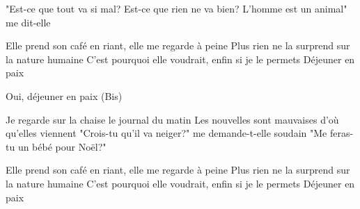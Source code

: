 "Est-ce que tout va si mal? Est-ce que rien ne va bien?
L'homme est un animal" me dit-elle
\endverse

\beginverse
Elle prend son café en riant, elle me regarde à peine
Plus rien ne la surprend sur la nature humaine
C'est pourquoi elle voudrait, enfin si je le permets
Déjeuner en paix
\endverse

\beginverse
Oui, déjeuner en paix
(Bis)
\endverse

\beginverse
Je regarde sur la chaise le journal du matin
Les nouvelles sont mauvaises d'où qu'elles viennent
"Crois-tu qu'il va neiger?" me demande-t-elle soudain
"Me feras-tu un bébé pour Noël?"
\endverse

\beginverse
Elle prend son café en riant, elle me regarde à peine
Plus rien ne la surprend sur la nature humaine
C'est pourquoi elle voudrait, enfin si je le permets
Déjeuner en paix
\]\]\]\]\]\]\]\]\]\]\]\]\]\]\]\]\]\]\]\]\]\]\]\]\]\]\]\]\]\]\]\]\]\]\]\]\]\]\]\]\]\]\]\]\]\]\]\]\]\]\]\]\]\]\]\]\]\]\]\]\]\]\]\]\]\]\]\]\]\]\]\]\]\]\]\]\]\]\]\]\]\]\]\]\]\]\]\]\]\]\]\]\]\]\]\]\]\]\]\]\]\]\]\]\]\]\]\]\]\]\]\]\]\]\]\]\]\]\]\]\]\]\]\]\]\]\]\]\]\]\]\]\]\]\]\]\]\]\]\]\]\]\]\]\]\]\]\]\]\]\]\]\]\]\]\]\]\]\]\]\]\]\]\]\]\]\]\]\]\]\]\]\]\]\]\]\]\]\]\]\]\]\]\]\]\]\]\]\]\]\]\]\]\]\]\]\]\]\]\]\]\]\]\]\]\]\]\]\]\]\]\]\]\]\]\]\]\]\]\]\]\]\]\]\]\]\]\]\]\]\]\]\]\]\]\]\]\]\]\]\]\]\]\]\]\]\]\]\]\]\]\]\]\]\]\]\]\]\]\]\]\]\]\]\]\]\]\]\]\]\]\]\]\]\]\]\]\]\]\]\]\]\]\]\]\]\]\]\]\]\]\]\]\]\]\]\]\]\]\]\]\]\]\]\]\]\]\]\]\]\]\]\]\]\]\]\]\]\]\]\]\]\]\]\]\]\]\]\]\]\]\]\]\]\]\]\]\]\]\]\]\]\]\]\]\]\]\]\]\]\]\]\]\]\]\]\]\]\]\]\]\]\]\]\]\]\]\]\]\]\]\]\]\]\]\]\]\]\]\]\]\]\]\]\]\]\]\]\]\]\]\]\]\]\]\]\]\]\]\]\]\]\]\]\]\]\]\]\]\]\]\]\]\]\]\]\]\]\]\]\]\]\]\]\]\]\]\]\]\]\]\]\]\]\]\]\]\]\]\]\]\]\]\]\]\]\]\]\]\]\]\]\]\]\]\]\]\]\]\]\]\]\]\]\]\]\]\]\]\]\]\]\]\]\]\]\]\]\]\]\]\]\]\]\]\]\]\]\]\]\]\]\]\]\]\]\]\]\]\]\]\]\]\]\]\]\]\]\]\]\]\]\]\]\]\]\]\]\]\]\]\]\]\]\]\]\]\]\]\]\]\]\]\]\]\]\]\]\]\]\]\]\]\]\]\]\]\]\]\]\]\]\]\]\]\]\]\]\]\]\]\]\]\]\]\]\]\]\]\]\]\]\]\]\]\]\]\]\]\]\]\]\]\]\]\]\]\]\]\]\]\]\]\]\]\]\]\]\]\]\]\]\]\]\]\]\]\]\]\]\]\]\]\]\]\]\]\]\]\]\]\]\]\]\]\]\]\]\]\]\]\]\]\]\]\]\]\]\]\]\]\]\]\]\]\]\]\]\]\]\]\]\]\]\]\]\]\]\]\]\]\]\]\]\]\]\]\]\]\]\]\]\]\]\]\]\]\]\]\]\]\]\]\]\]\]\]\]\]\]\]\]\]\]\]\]\]\]\]\]\]\]\]\]\]\]\]\]\]\]\]\]\]\]\]\]\]\]\]\]\]\]\]\]\]\]\]\]\]\]\]\]\]\]\]\]\]\]\]\]\]\]\]\]\]\]\]\]\]\]\]\]\]\]\]\]\]\]\]\]\]\]\]\]\]\]\]\]\]\]\]\]\]\]\]\]\]\]\]\]\]\]\]\]\]\]\]\]\]\]\]\]\]\]\]\]\]\]\]\]\]\]\]\]\]\]\]\]\]\]\]\]\]\]\]\]\]\]\]\]\]\]\]\]\]\]\]\]\]\]\]\]\]\]\]\]\]\]\]\]\]\]\]\]\]\]\]\]\]\]\]\]\]\]\]\]\]\]\]\]\]\]\]\]\]\]\]\]\]\]\]\]\]\]\]\]\]\]\]\]\]\]\]\]\]\]\]\]\]\]\]\]\]\]\]\]\]\]\]\]\]\]\]\]\]\]\]\]\]\]\]\]\]\]\]\]\]\]\]\]\]\]\]\]\]\]\]\]\]\]\]\]\]\]\]\]\]\]\]\]\]\]\]\]\]\]\]\]\]\]\]\]\]\]\]\]\]\]\]\]\]\]\]\]\]\]\]\]\]\]\]\]\]\]\]\]\]\]\]\]\]\]\]\]\]\]\]\]\]\]\]\]\]\]\]\]\]\]\]\]\]\]\]\]\]\]\]\]\]\]\]\]\]\]\]\]\]\]\]\]\]\]\]\]\]\]\]\]\]\]\]\]\]\]\]\]\]\]\]\]\]\]\]\]\]\]\]\]\]\]\]\]\]\]\]\]\]\]\]\]\]\]\]\]\]\]\]\]\]\]\]\]\]\]\]\]\]\]\]\]\]\]\]\]\]\]\]\]\]\]\]\]\]\]\]\]\]\]\]\]\]\]\]\]\]\]\]\]\]\]\]\]\]\]\]\]\]\]\]\]\]\]\]\]\]\]\]\]\]\]\]\]\]\]\]\]\]\]\]\]\]\]\]\]\]\]\]\]\]\]\]\]\]\]\]\]\]\]\]\]\]\]\]\]\]\]\]\]\]\]\]\]\]\]\]\]\]\]\]\]\]\]\]\]\]\]\]\]\]\]\]\]\]\]\]\]\]\]\]\]\]\]\]\]\]\]\]\]\]\]\]\]\]\]\]\]\]\]\]\]\]\]\]\]\]\]\]\]\]\]\]\]\]\]\]\]\]\]\]
